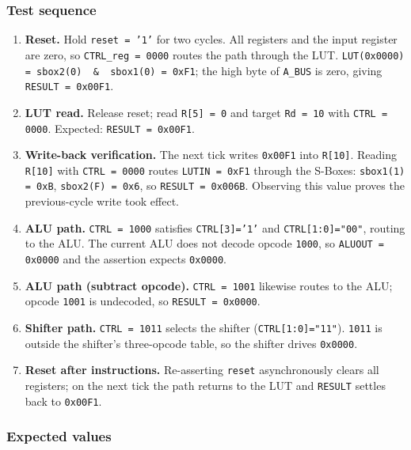 \documentclass[11pt,a4paper]{article}
\begin{document}
\subsubsection*{Test sequence}

\begin{enumerate}[leftmargin=*]
  \item \textbf{Reset.} Hold \texttt{reset = '1'} for two cycles. All
        registers and the input register are zero, so \texttt{CTRL\_reg = 0000}
        routes the path through the LUT.
        \texttt{LUT(0x0000) = sbox2(0) \,\&\, sbox1(0) = 0xF1};
        the high byte of \texttt{A\_BUS} is zero, giving
        \texttt{RESULT = 0x00F1}.
  \item \textbf{LUT read.} Release reset; read \texttt{R[5] = 0} and
        target \texttt{Rd = 10} with \texttt{CTRL = 0000}. Expected:
        \texttt{RESULT = 0x00F1}.
  \item \textbf{Write-back verification.} The next tick writes
        \texttt{0x00F1} into \texttt{R[10]}. Reading \texttt{R[10]}
        with \texttt{CTRL = 0000} routes \texttt{LUTIN = 0xF1} through
        the S-Boxes: \texttt{sbox1(1) = 0xB}, \texttt{sbox2(F) = 0x6},
        so \texttt{RESULT = 0x006B}. Observing this value proves the
        previous-cycle write took effect.
  \item \textbf{ALU path.} \texttt{CTRL = 1000} satisfies
        \texttt{CTRL[3]='1'} and \texttt{CTRL[1:0]="00"}, routing to
        the ALU. The current ALU does not decode opcode \texttt{1000},
        so \texttt{ALUOUT = 0x0000} and the assertion expects
        \texttt{0x0000}.
  \item \textbf{ALU path (subtract opcode).} \texttt{CTRL = 1001}
        likewise routes to the ALU; opcode \texttt{1001} is
        undecoded, so \texttt{RESULT = 0x0000}.
  \item \textbf{Shifter path.} \texttt{CTRL = 1011} selects the
        shifter (\texttt{CTRL[1:0]="11"}). \texttt{1011} is outside
        the shifter's three-opcode table, so the shifter drives
        \texttt{0x0000}.
  \item \textbf{Reset after instructions.} Re-asserting \texttt{reset}
        asynchronously clears all registers; on the next tick the
        path returns to the LUT and \texttt{RESULT} settles back to
        \texttt{0x00F1}.
\end{enumerate}

\subsubsection*{Expected values}
\end{document}

